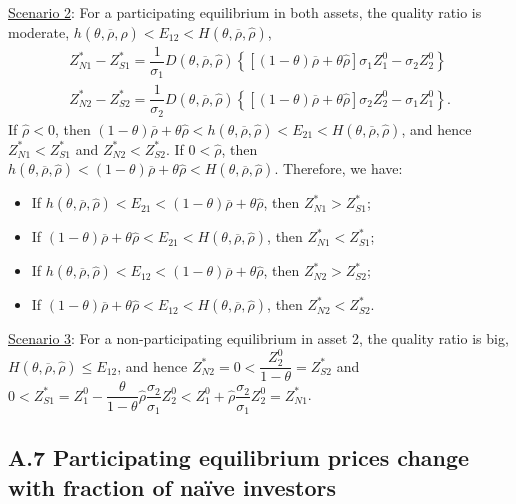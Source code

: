 \documentclass[10pt]{article}
\begin{document}
\underline{Scenario 2}: For a participating equilibrium in both assets, the quality ratio is moderate, $ h (\theta, \overline{\rho}, {\hat \rho}) < E_{1 2} < H (\theta, \overline{\rho}, {\hat \rho}) $, 
\begin{eqnarray*}
& Z_{N 1}^* - Z_{S 1}^* = \dfrac{1}{\sigma_1} D (\theta, \overline{\rho}, {\hat \rho}) \left\{ \left[ (1 - \theta) \overline{\rho} + \theta {\hat \rho} \right] \sigma_1 Z_1^0 - \sigma_2 Z_2^0 \right\} & \\
& Z_{N 2}^* - Z_{S 2}^* = \dfrac{1}{\sigma_2} D (\theta, \overline{\rho}, {\hat \rho}) \left\{ \left[ (1 - \theta) \overline{\rho} + \theta {\hat \rho} \right] \sigma_2 Z_2^0 - \sigma_1 Z_1^0 \right\}. &
\end{eqnarray*}
If $ {\hat \rho} < 0 $, then $ (1 - \theta) \overline{\rho} + \theta {\hat \rho} < h (\theta, \overline{\rho}, {\hat \rho}) < E_{2 1} < H (\theta, \overline{\rho}, {\hat \rho}) $, and hence $ Z_{N 1}^* < Z_{S 1}^* $ and $ Z_{N 2}^* < Z_{S 2}^* $.
If $ 0 < {\hat \rho} $, then $ h (\theta, \overline{\rho}, {\hat \rho}) < (1 - \theta) \overline{\rho} + \theta {\hat \rho} < H (\theta, \overline{\rho}, {\hat \rho}) $. Therefore, we have:
\begin{itemize}
\item If $ h (\theta, \overline{\rho}, {\hat \rho}) < E_{2 1} < (1 - \theta) \overline{\rho} + \theta {\hat \rho} $, then $ Z_{N 1}^* > Z_{S 1}^* $;
\item If $ (1 - \theta) \overline{\rho} + \theta {\hat \rho} < E_{2 1} < H (\theta, \overline{\rho}, {\hat \rho}) $, then $ Z_{N 1}^* < Z_{S 1}^* $;
\item If $ h (\theta, \overline{\rho}, {\hat \rho}) < E_{1 2} < (1 - \theta) \overline{\rho} + \theta {\hat \rho} $, then $ Z_{N 2}^* > Z_{S 2}^* $;
\item If $ (1 - \theta) \overline{\rho} + \theta {\hat \rho} < E_{1 2} < H (\theta, \overline{\rho}, {\hat \rho}) $, then $ Z_{N 2}^* < Z_{S 2}^* $.
\end{itemize}

\underline{Scenario 3}: For a non-participating equilibrium in asset 2, the quality ratio is big, $ H (\theta, \overline{\rho}, {\hat \rho}) \leqslant E_{1 2} $, and hence $ Z_{N 2}^* = 0 < \dfrac{Z_2^0}{1 - \theta} = Z_{S 2}^* $ and $ 0 < Z_{S 1}^* = Z_1^0 - \dfrac{\theta}{1 - \theta} {\hat \rho} \dfrac{\sigma_2}{\sigma_1} Z_2^0 < Z_1^0 + {\hat \rho} \dfrac{\sigma_2}{\sigma_1} Z_2^0 = Z_{N 1}^* $.

\subsection*{A.7 \quad Participating equilibrium prices change with fraction of na\"ive investors}
\end{document}

